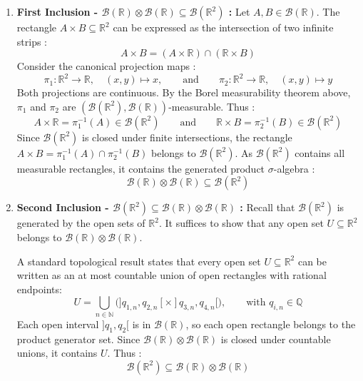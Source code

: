 \begin{enumerate}[label=\textbf{§}]
    \item \textbf{First Inclusion - $\mathcal{B}(\mathbb{R}) \otimes \mathcal{B}(\mathbb{R}) \subseteq \mathcal{B}(\mathbb{R}^2)$ :}
    Let $A, B \in \mathcal{B}(\mathbb{R})$. The rectangle $A \times B \subseteq \mathbb{R}^2$ can be expressed as the intersection of two infinite strips :
    \[
        A \times B = (A \times \mathbb{R}) \cap (\mathbb{R} \times B)
    \]
    Consider the canonical projection maps :
    \[
        \pi_1 : \mathbb{R}^2 \to \mathbb{R}, \quad (x, y) \mapsto x, \qquad \text{and} \qquad \pi_2 : \mathbb{R}^2 \to \mathbb{R}, \quad (x, y) \mapsto y
    \]
    Both projections are continuous. By the Borel measurability theorem above, $\pi_1$ and $\pi_2$ are $(\mathcal{B}(\mathbb{R}^2), \mathcal{B}(\mathbb{R}))$-measurable. Thus :
    \[
        A \times \mathbb{R} = \pi_1^{-1}(A) \in \mathcal{B}(\mathbb{R}^2) \qquad \text{and} \qquad \mathbb{R} \times B = \pi_2^{-1}(B) \in \mathcal{B}(\mathbb{R}^2)
    \]
    Since $\mathcal{B}(\mathbb{R}^2)$ is closed under finite intersections, the rectangle $A \times B = \pi_1^{-1}(A) \cap \pi_2^{-1}(B)$ belongs to $\mathcal{B}(\mathbb{R}^2)$. As $\mathcal{B}(\mathbb{R}^2)$ contains all measurable rectangles, it contains the generated product $\sigma$-algebra :
    \[
        \mathcal{B}(\mathbb{R}) \otimes \mathcal{B}(\mathbb{R}) \subseteq \mathcal{B}(\mathbb{R}^2)
    \]

    \item \textbf{Second Inclusion - $\mathcal{B}(\mathbb{R}^2) \subseteq \mathcal{B}(\mathbb{R}) \otimes \mathcal{B}(\mathbb{R})$ :}
    Recall that $\mathcal{B}(\mathbb{R}^2)$ is generated by the open sets of $\mathbb{R}^2$. It suffices to show that any open set $U \subseteq \mathbb{R}^2$ belongs to $\mathcal{B}(\mathbb{R}) \otimes \mathcal{B}(\mathbb{R})$.
    
    A standard topological result states that every open set $U \subseteq \mathbb{R}^2$ can be written as an at most countable union of open rectangles with rational endpoints:
    \[
        U = \bigcup_{n \in \mathbb{N}} \big( ]q_{1,n}, q_{2,n}[ \times ]q_{3,n}, q_{4,n}[ \big), \qquad \text{with } q_{i,n} \in \mathbb{Q}
    \]
    Each open interval $]q_1, q_2[$ is in $\mathcal{B}(\mathbb{R})$, so each open rectangle belongs to the product generator set. Since $\mathcal{B}(\mathbb{R}) \otimes \mathcal{B}(\mathbb{R})$ is closed under countable unions, it contains $U$. Thus :
    \[
        \mathcal{B}(\mathbb{R}^2) \subseteq \mathcal{B}(\mathbb{R}) \otimes \mathcal{B}(\mathbb{R})
    \]
\end{enumerate}

